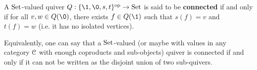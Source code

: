             \begin{definition} \label{def: connected_quivers}
                A $\mathrm{Set}$-valued quiver $Q: \{\1, \0, s, t\}^{\op} \to \Sets$ is said to be \textbf{connected} if and only if for all $v, w \in Q(\0)$, there exists $f \in Q(\1)$ such that $s(f) = v$ and $t(f) = w$ (i.e. it has no isolated vertices).
            \end{definition}
            \begin{remark}
                Equivalently, one can say that a $\mathrm{Set}$-valued (or maybe with values in any category $\mathcal{C}$ with enough coproducts and sub-objects) quiver is connected if and only if it can not be written as the disjoint union of two sub-quivers. 
            \end{remark}
            
